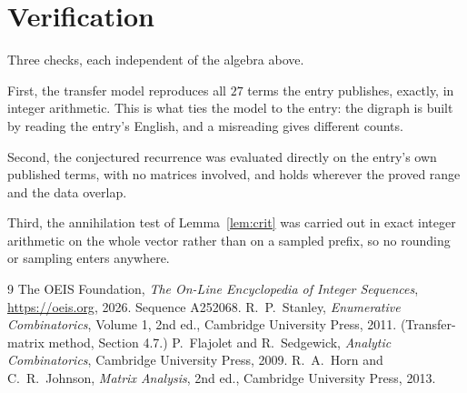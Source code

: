 \documentclass[11pt,a4paper]{article}
\theoremstyle{plain}
\theoremstyle{definition}
\begin{document}
\section{Verification}

Three checks, each independent of the algebra above.

First, the transfer model reproduces all $27$ terms the entry publishes, exactly, in
integer arithmetic. This is what ties the model to the entry: the digraph is built by reading
the entry's English, and a misreading gives different counts.

Second, the conjectured recurrence was evaluated directly on the entry's own published terms,
with no matrices involved, and holds wherever the proved range and the data overlap.

Third, the annihilation test of Lemma~\ref{lem:crit} was carried out in exact integer
arithmetic on the whole vector rather than on a sampled prefix, so no rounding or sampling
enters anywhere.

\begin{thebibliography}{9}
 The OEIS Foundation, \emph{The On-Line Encyclopedia of Integer
Sequences}, \url{https://oeis.org}, 2026. Sequence A252068.
 R.~P.~Stanley, \emph{Enumerative Combinatorics}, Volume 1, 2nd ed.,
Cambridge University Press, 2011. (Transfer-matrix method, Section 4.7.)
 P.~Flajolet and R.~Sedgewick, \emph{Analytic Combinatorics}, Cambridge
University Press, 2009.
 R.~A.~Horn and C.~R.~Johnson, \emph{Matrix Analysis}, 2nd ed., Cambridge
University Press, 2013.
\end{thebibliography}
\end{document}
